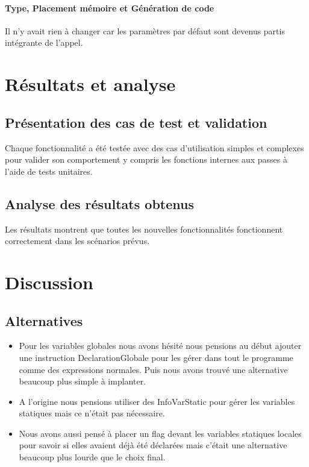 \documentclass[a4paper,12pt]{article}
\begin{document}
\paragraph{Type, Placement mémoire et Génération de code}
Il n'y avait rien à changer car les paramètres par défaut sont devenus partis intégrante de l'appel.


\section{R\'esultats et analyse}
\subsection{Pr\'esentation des cas de test et validation}
Chaque fonctionnalit\'e a \'et\'e test\'ee avec des cas d'utilisation simples et complexes pour valider son comportement y compris les fonctions internes aux passes à l'aide de tests unitaires.

\subsection{Analyse des r\'esultats obtenus}
Les r\'esultats montrent que toutes les nouvelles fonctionnalit\'es fonctionnent correctement dans les sc\'enarios pr\'evus.

\section{Discussion}
\subsection{Alternatives}
\begin{itemize}
\item Pour les variables globales nous avons hésité nous pensions au début ajouter une instruction DeclarationGlobale pour les gérer dans tout le programme comme des expressions normales. Puis nous avons trouvé une alternative beaucoup plus simple à implanter.

\item A l'origine nous pensions utiliser des InfoVarStatic pour gérer les variables statiques mais ce n'était pas nécessaire.
\item Nous avons aussi pensé à placer un flag devant les variables statiques locales pour savoir si elles avaient déjà été déclarées mais c'était une alternative beaucoup plus lourde que le choix final.

\end{itemize}
\end{document}
